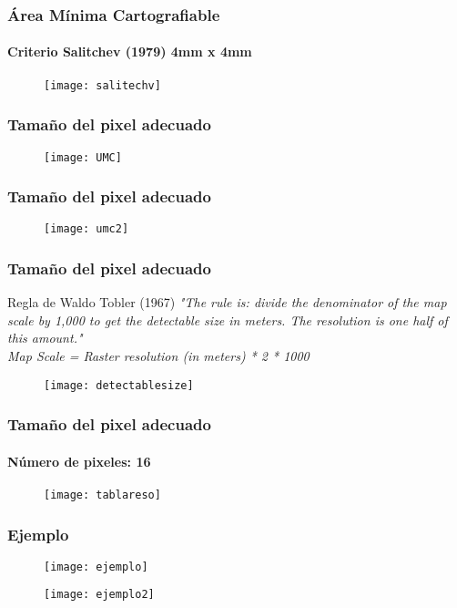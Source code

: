 \documentclass[14pt]{beamer}
\begin{document}
\begin{frame}
\frametitle{Área Mínima Cartografiable}
\framesubtitle{Criterio Salitchev (1979) 4mm x 4mm}
 \begin{figure}
    \centering
    \texttt{[image: salitechv]}
  \end{figure}
\end{frame}
\begin{frame}
\frametitle{Tamaño del pixel adecuado}
 \begin{figure}
    \centering
    \texttt{[image: UMC]}
  \end{figure}
\end{frame}
\begin{frame}
\frametitle{Tamaño del pixel adecuado}
 \begin{figure}
    \centering
    \texttt{[image: umc2]}
  \end{figure}
\end{frame}
\begin{frame}
\frametitle{Tamaño del pixel adecuado}
\begin{exampleblock}{Regla de Waldo Tobler (1967) }
\small{\emph{"The rule is: divide the denominator of the map scale by 1,000 to get the detectable size in meters. The resolution is one half of this amount."\\
Map Scale = Raster resolution (in meters) * 2 * 1000}}
\end{exampleblock}
 \begin{figure}
    \centering
    \texttt{[image: detectablesize]}
  \end{figure}
\end{frame}
\begin{frame}
\frametitle{Tamaño del pixel adecuado}
\framesubtitle{Número de pixeles: 16}
 \begin{figure}
    \centering
    \texttt{[image: tablareso]}
  \end{figure}
\end{frame}
\begin{frame}
\frametitle{Ejemplo}
 \begin{figure}
    \centering
    \texttt{[image: ejemplo]}
  \end{figure}
\end{frame}
\begin{frame}
\begin{figure}
    \centering
    \texttt{[image: ejemplo2]}
  \end{figure}
\end{frame}
\end{document}
